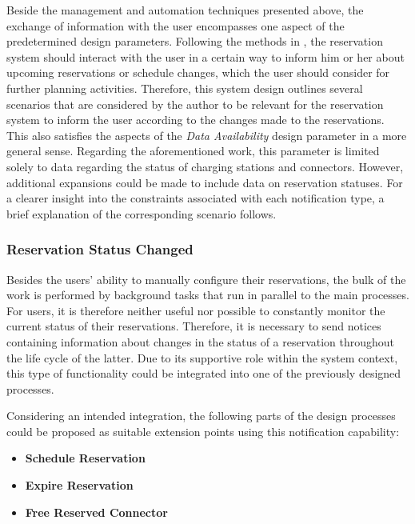 Beside the management and automation techniques presented above, the exchange of information with the user encompasses one aspect of the predetermined design parameters.
Following the methods in \cite{zarkeshev_charging_2018}, the reservation system should interact with the user in a certain way to inform him or her about upcoming reservations or schedule changes, which the user should consider for further planning activities.
Therefore, this system design outlines several scenarios that are considered by the author to be relevant for the reservation system to inform the user according to the changes made to the reservations. 
This also satisfies the aspects of the \textit{Data Availability} design parameter in a more general sense. Regarding the aforementioned work, this parameter is limited solely to data regarding the status of charging stations and connectors. However, additional expansions could be made to include data on reservation statuses.
For a clearer insight into the constraints associated with each notification type, a brief explanation of the corresponding scenario follows. 

\subsubsection{Reservation Status Changed}
\label{ch:Design:sec:Reservation System:ssec:Notification Capabilities:sssec:Reservation Status Changed}

Besides the users' ability to manually configure their reservations, the bulk of the work is performed by background tasks that run in parallel to the main processes.
For users, it is therefore neither useful nor possible to constantly monitor the current status of their reservations. Therefore, it is necessary to send notices containing information about changes in the status of a reservation throughout the life cycle of the latter.
Due to its supportive role within the system context, this type of functionality could be integrated into one of the previously designed processes. 

\noindent Considering an intended integration, the following parts of the design processes could be proposed as suitable extension points using this notification capability:
\begin{itemize}
    \item \textbf{Schedule Reservation}
    \item \textbf{Expire Reservation}
    \item \textbf{Free Reserved Connector}
\end{itemize}

